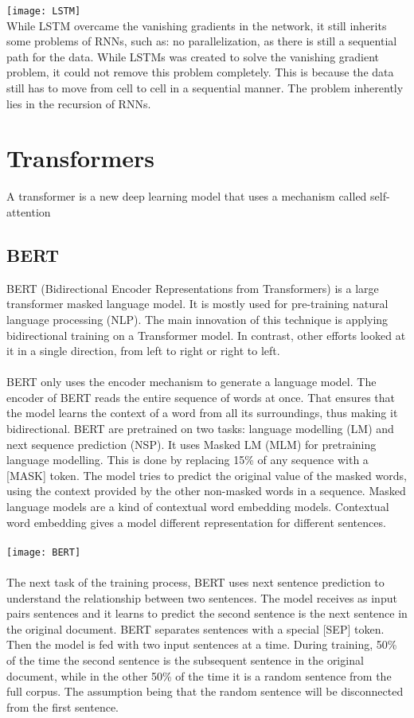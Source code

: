 \texttt{[image: LSTM]}
\\ While LSTM overcame the vanishing gradients in the network, it still inherits some problems of RNNs, such as: no parallelization, as there is still a sequential path for the data. While LSTMs was created to solve the vanishing gradient problem, it could not remove this problem completely. This is because the data still has to move from cell to cell in a sequential manner. The problem inherently lies in the recursion of RNNs.
\section{Transformers}
A transformer is a new deep learning model that uses a mechanism called self-attention 
\subsection{BERT}
BERT (Bidirectional Encoder Representations from Transformers) is a large transformer masked language model. It is mostly used for pre-training natural language processing (NLP). The main innovation of this technique is applying bidirectional training on a Transformer model. In contrast, other efforts looked at it in a single direction, from left to right or right to left. \\\\
BERT only uses the encoder mechanism to generate a language model. The encoder of BERT reads the entire sequence of words at once. That ensures that the model learns the context of a word from all its surroundings, thus making it bidirectional. BERT are pretrained on two tasks: language modelling (LM) and next sequence prediction (NSP). It uses Masked LM (MLM) for pretraining language modelling. This is done by replacing 15\% of any sequence with a [MASK] token. The model tries to predict the original value of the masked words, using the context provided by the other non-masked words in a sequence. Masked language models are a kind of contextual word embedding models. Contextual word embedding gives a model different representation for different sentences.\\\\ 
\texttt{[image: BERT]}
\\\\ The next task of the training process, BERT uses next sentence prediction to understand the relationship between two sentences. The model receives as input pairs sentences and it learns to predict the second sentence is the next sentence in the original document. BERT separates sentences with a special [SEP] token. Then the model is fed with two input sentences at a time. During training, 50\% of the time the second sentence is the subsequent sentence in the original document, while in the other 50\% of the time it is a random sentence from the full corpus. The assumption being that the random sentence will be disconnected from the first sentence.
